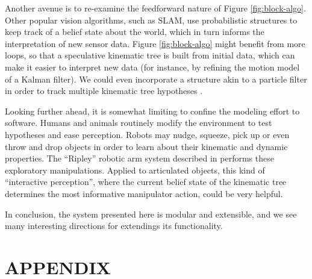 \documentclass[letterpaper, 10 pt, conference]{ieeeconf}  %
\begin{document}
Another avenue is to re-examine the feedforward nature of Figure \ref{fig:block-algo}. Other popular vision algorithms, such as SLAM, use probabilistic structures to keep track of a belief state about the world, which in turn informs the interpretation of new sensor data. Figure \ref{fig:block-algo} might benefit from more loops, so that a speculative kinematic tree is built from initial data, which can make it easier to interpret new data (for instance, by refining the motion model of a Kalman filter). We could even incorporate a structure akin to a particle filter in order to track multiple kinematic tree hypotheses \cite{Thrun2002}.

Looking further ahead, it is somewhat limiting to confine the modeling effort to software. Humans and animals routinely modify the environment to test hypotheses and ease perception. Robots may nudge, squeeze, pick up or even throw and drop objects in order to learn about their kinematic and dynamic properties. The ``Ripley'' robotic arm system described in \cite{Hsiao2005} performs these exploratory manipulations. Applied to articulated objects, this kind of ``interactive perception'', where the current belief state of the kinematic tree determines the most informative manipulator action, could be very helpful.

In conclusion, the system presented here is modular and extensible, and we see many interesting directions for extendings its functionality.


\section{APPENDIX}
\end{document}
